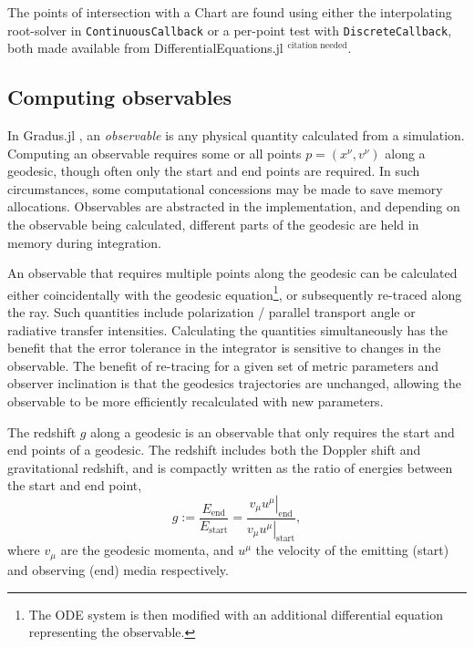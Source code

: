 \documentclass[fleqn,usenatbib]{mnras}
\newcommand{\citneeded}{{\bf \color{red} $^{\text{citation needed}}$}}
\newcommand{\Gradus}{Gradus.jl }
\begin{document}
The points of intersection with a Chart are found using either the interpolating
root-solver in \texttt{ContinuousCallback} or a per-point test with
\texttt{DiscreteCallback}, both made available from DifferentialEquations.jl
\citneeded.

\subsection{Computing observables}
\label{sec:computing-observables}

In \Gradus, an \textit{observable} is any physical quantity calculated from a
simulation. Computing an observable requires some or all points $p = (x^\nu,
v^\nu)$ along a geodesic, though often only the start and end points are
required. In such circumstances, some computational concessions may be made to
save memory allocations. Observables are abstracted in the implementation, and
depending on the observable being calculated, different parts of the geodesic
are held in memory during integration.

An observable that requires multiple points along the geodesic can be calculated
either coincidentally with the geodesic equation\footnote{The ODE system is then
modified with an additional differential equation representing the observable.},
or subsequently re-traced along the ray. Such quantities include polarization /
parallel transport angle or radiative transfer intensities. Calculating the
quantities simultaneously has the benefit that the error tolerance in the
integrator is sensitive to changes in the observable. The benefit of re-tracing
for a given set of metric parameters and observer inclination is that the
geodesics trajectories are unchanged, allowing the observable to be more
efficiently recalculated with new parameters.

The redshift $g$ along a geodesic is an observable that only requires the start
and end points of a geodesic. The redshift includes both the Doppler shift and
gravitational redshift, and is compactly written as the ratio of energies
between the start and end point,
\begin{equation}
\label{eq:redshift}
g := \frac{E_\text{end}}{E_\text{start}} = \frac{\left. v_\mu u^\mu
\right\rvert_\text{end}}{\left. v_\mu u^\mu \right\rvert_{\text{start}}},
\end{equation}
where $v_\mu$ are the geodesic momenta, and $u^\mu$ the velocity of the emitting
(start) and observing (end) media respectively.
\end{document}
